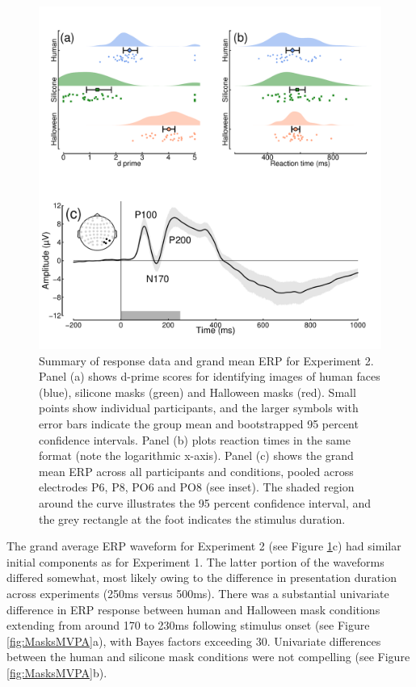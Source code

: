 \documentclass[
]{article}
\begin{document}
\begin{figure}

{\centering \includegraphics{Figures/MaskSData} 

}

\caption{Summary of response data and grand mean ERP for Experiment 2. Panel (a) shows d-prime scores for identifying images of human faces (blue), silicone masks (green) and Halloween masks (red). Small points show individual participants, and the larger symbols with error bars indicate the group mean and bootstrapped 95 percent confidence intervals. Panel (b) plots reaction times in the same format (note the logarithmic x-axis). Panel (c) shows the grand mean ERP across all participants and conditions, pooled across electrodes P6, P8, PO6 and PO8 (see inset). The shaded region around the curve illustrates the 95 percent confidence interval, and the grey rectangle at the foot indicates the stimulus duration.}\label{fig:MasksData}
\end{figure}

The grand average ERP waveform for Experiment 2 (see Figure \ref{fig:MasksData}c) had similar initial components as for Experiment 1. The latter portion of the waveforms differed somewhat, most likely owing to the difference in presentation duration across experiments (250ms versus 500ms). There was a substantial univariate difference in ERP response between human and Halloween mask conditions extending from around 170 to 230ms following stimulus onset (see Figure \ref{fig:MasksMVPA}a), with Bayes factors exceeding 30. Univariate differences between the human and silicone mask conditions were not compelling (see Figure \ref{fig:MasksMVPA}b).
\end{document}
